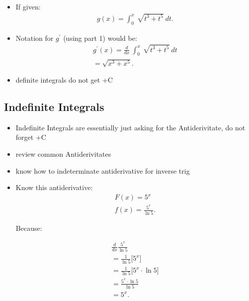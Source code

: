 \documentclass{report}
\begin{document}
\begin{itemize}
\begin{itemize}
          \item If given:
            \begin{align*}
              g(x) = \int_{0}^{x}\ \sqrt{t^{3} + t^{5}}\ dt
            .\end{align*}
          \item Notation for $g^{\prime}$ (using part 1) would be:
            \begin{align*}
              g^{\prime}(x) = \frac{d}{dx}\ \int_{0}^{x}\ \sqrt{t^{3} + t^{5}}\ dt \\
              = \sqrt{x^{3} + x^{5}}
            .\end{align*}
          \item definite integrals do not get +C
        \end{itemize}
      \end{itemize}

      \bigbreak \noindent \bigbreak \noindent 
      \subsection{Indefinite Integrals}
      \begin{itemize}
        \item  Indefinite Integrals are essentially just asking for the Antiderivitate, do not forget +C
        \item review common Antiderivitates
        \item know how to indeterminate antiderivative for inverse trig
        \item Know this antiderivative:
          \begin{align*}
            F(x) = 5^{x} \\
            f(x) = \frac{5^{x}}{\ln{5}} 
          .\end{align*}
          \begin{center}
            Because:
          \end{center}
          \begin{align*}
            \frac{d}{dx}\frac{5^{x}}{\ln{5}} \\
            =\frac{1}{\ln{5}}\bigg[5^{x}\bigg] \\
            = \frac{1}{\ln{5}} \bigg[5^{x} \cdot \ln{5}\bigg] \\
            = \frac{5^{x} \cdot \ln{5}}{\ln{5}} \\
            \boxed{= 5^{x}}
          .\end{align*}
      \end{itemize}
\end{document}
